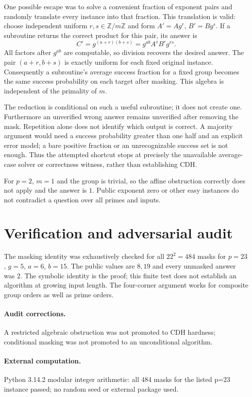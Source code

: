 \documentclass[11pt]{article}
\begin{document}
One possible escape was to solve a convenient fraction of exponent pairs and
randomly translate every instance into that fraction. This translation is valid:
choose independent uniform $r,s\in\mathbb Z/m\mathbb Z$ and form
$A'=Ag^r$, $B'=Bg^s$. If a subroutine returns the correct product for this pair,
its answer is
\[
 C'=g^{(a+r)(b+s)}=g^{ab}A^sB^r g^{rs}.
\]
All factors after $g^{ab}$ are computable, so division recovers the desired
answer. The pair $(a+r,b+s)$ is exactly uniform for each fixed original instance.
Consequently a subroutine's average success fraction for a fixed group becomes
the same success probability on each target after masking. This algebra is
independent of the primality of $m$.

The reduction is conditional on such a useful subroutine; it does not create one.
Furthermore an unverified wrong answer remains unverified after removing the
mask. Repetition alone does not identify which output is correct. A majority
argument would need a success probability greater than one half and an explicit
error model; a bare positive fraction or an unrecognizable success set is not
enough. Thus the attempted shortcut stops at precisely the unavailable
average-case solver or correctness witness, rather than establishing CDH.

For $p=2$, $m=1$ and the group is trivial, so the affine obstruction correctly
does not apply and the answer is $1$. Public exponent zero or other easy
instances do not contradict a question over all primes and inputs.
\section{Verification and adversarial audit}
The masking identity was exhaustively checked for all $22^2=484$ masks for
$p=23$, $g=5$, $a=6$, $b=15$. The public values are $8,19$ and every unmasked
answer was $2$. The symbolic identity is the proof; this finite test does not
establish an algorithm at growing input length. The four-corner argument works
for composite group orders as well as prime orders.
\paragraph{Audit corrections.} A restricted algebraic obstruction was not promoted to CDH hardness; conditional masking was not promoted to an unconditional algorithm.
\paragraph{External computation.} Python 3.14.2 modular integer arithmetic: all 484 masks for the listed p=23 instance passed; no random seed or external package used.
\end{document}
